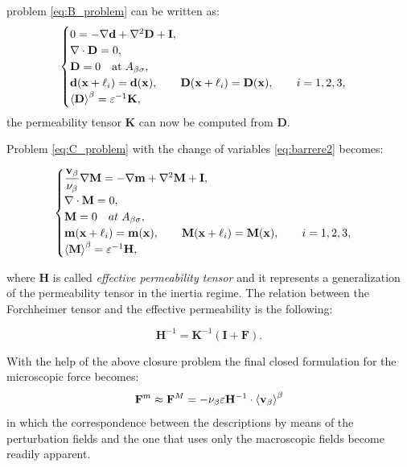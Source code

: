 \noindent problem \eqref{eq:B_problem} can be written as:
\begin{eqnarray}
	\begin{cases}
		0 = -\nabla \mathbf{d} + \nabla^2 \mathbf{D} +\mathbf{I},\\
		\nabla \cdot \mathbf{D} = 0,  \\
		\mathbf{D} = 0 \quad \textrm{at} \; A_{\beta \sigma} ,\\
		\mathbf{d}(\mathbf{x} +\ell_i) = \mathbf{d}(\mathbf{x}), \qquad \mathbf{D}(\mathbf{x} +\ell_i) = \mathbf{D}(\mathbf{x}), \qquad i=1,2,3 ,\\
		{\left< \mathbf{D} \right>}^{\beta} = \varepsilon^{-1} \mathbf{K},
	\end{cases}
\label{eq:D_problem}
\end{eqnarray}
the permeability tensor $\mathbf{K}$ can now be computed from $\mathbf{D}$.

\newpage 
\noindent Problem \eqref{eq:C_problem} with the change of variables \eqref{eq:barrere2} becomes:

\begin{eqnarray}
	\begin{cases}
		\dfrac{\textbf{v}_{\beta}}{\nu_{\beta}} \nabla \mathbf{M} = -\nabla \mathbf{m} + \nabla^2 \mathbf{M} +\mathbf{I},\\
		\nabla \cdot \mathbf{M} = 0,  \\
		\mathbf{M} = 0 \quad at \; A_{\beta \sigma}, \\
		\mathbf{m}(\mathbf{x} +\ell_i) = \mathbf{m}(\mathbf{x}), \qquad \mathbf{M}(\mathbf{x} +\ell_i) = \mathbf{M}(\mathbf{x}), \qquad i=1,2,3 ,\\
		{\left< \mathbf{M} \right>}^{\beta} = \varepsilon^{-1} \mathbf{H},
	\end{cases}
\label{eq:M_problem}
\end{eqnarray}

\noindent where $\mathbf{H}$ is called \textit{effective permeability tensor} and it represents a generalization of the permeability tensor in the inertia regime.
The relation between the Forchheimer tensor and the effective permeability is the following:

$$
\mathbf{H}^{-1} = \mathbf{K}^{-1} \left(\mathbf{I} +\mathbf{F}\right).
$$

With the help of the above closure problem the final closed formulation for the microscopic force becomes:
\begin{equation}
\mathbf{F}^m \approx \mathbf{F}^M = - \nu_{\beta} \varepsilon \mathbf{H}^{-1} \cdot {\left< \textbf{v}_{\beta}\right>}^{\beta}
\label{eq:closure_final}
\end{equation}
in which the correspondence between the descriptions by means of the perturbation fields and the one that uses only the macroscopic fields become readily apparent.

